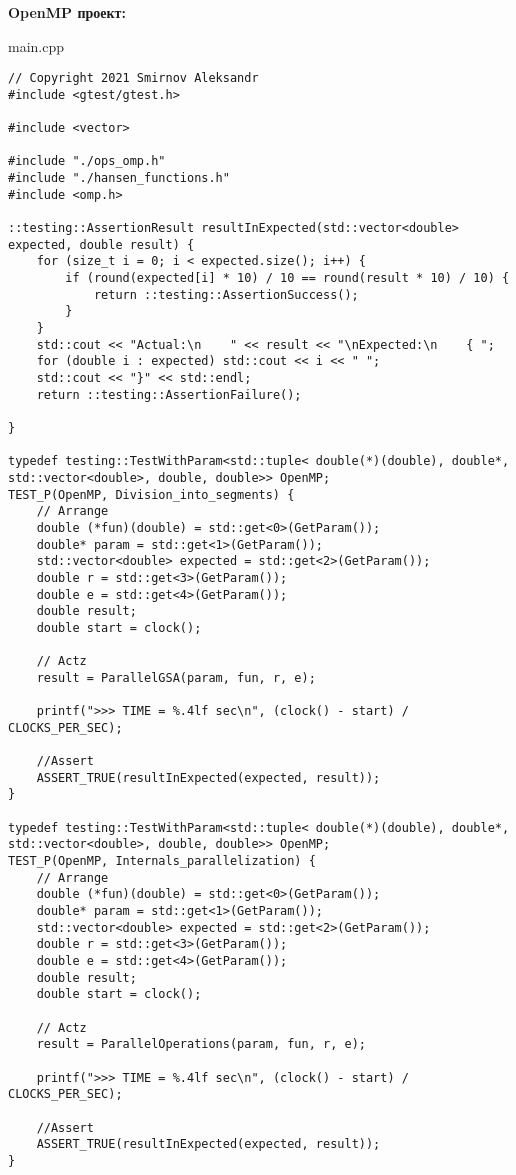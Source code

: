 \documentclass{report}
\begin{document}
\textbf{OpenMP проект:}

main.cpp
\begin{lstlisting}
// Copyright 2021 Smirnov Aleksandr
#include <gtest/gtest.h>

#include <vector>

#include "./ops_omp.h"
#include "./hansen_functions.h"
#include <omp.h>

::testing::AssertionResult resultInExpected(std::vector<double> expected, double result) {
    for (size_t i = 0; i < expected.size(); i++) {
        if (round(expected[i] * 10) / 10 == round(result * 10) / 10) {
            return ::testing::AssertionSuccess();
        }
    }
    std::cout << "Actual:\n    " << result << "\nExpected:\n    { ";
    for (double i : expected) std::cout << i << " ";
    std::cout << "}" << std::endl;
    return ::testing::AssertionFailure();

}

typedef testing::TestWithParam<std::tuple< double(*)(double), double*, std::vector<double>, double, double>> OpenMP;
TEST_P(OpenMP, Division_into_segments) {
    // Arrange
    double (*fun)(double) = std::get<0>(GetParam());
    double* param = std::get<1>(GetParam());
    std::vector<double> expected = std::get<2>(GetParam());
    double r = std::get<3>(GetParam());
    double e = std::get<4>(GetParam());
    double result;
    double start = clock();

    // Actz
    result = ParallelGSA(param, fun, r, e);

    printf(">>> TIME = %.4lf sec\n", (clock() - start) / CLOCKS_PER_SEC);

    //Assert
    ASSERT_TRUE(resultInExpected(expected, result));
}

typedef testing::TestWithParam<std::tuple< double(*)(double), double*, std::vector<double>, double, double>> OpenMP;
TEST_P(OpenMP, Internals_parallelization) {
    // Arrange
    double (*fun)(double) = std::get<0>(GetParam());
    double* param = std::get<1>(GetParam());
    std::vector<double> expected = std::get<2>(GetParam());
    double r = std::get<3>(GetParam());
    double e = std::get<4>(GetParam());
    double result;
    double start = clock();

    // Actz
    result = ParallelOperations(param, fun, r, e);

    printf(">>> TIME = %.4lf sec\n", (clock() - start) / CLOCKS_PER_SEC);

    //Assert
    ASSERT_TRUE(resultInExpected(expected, result));
}


\end{lstlisting}
\end{document}
